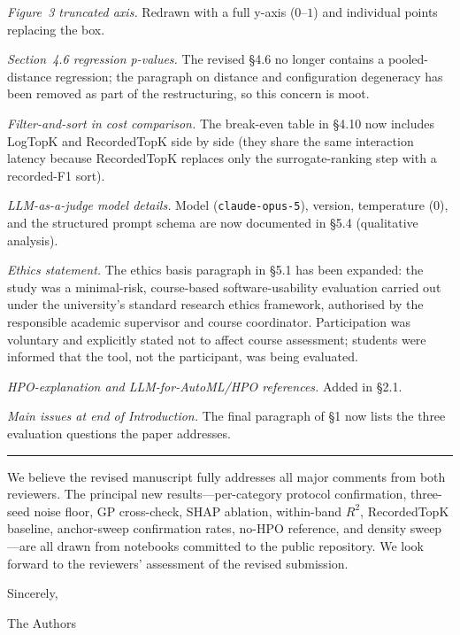 \documentclass[11pt,a4paper]{article}
\begin{document}
\noindent\textit{Figure~3 truncated axis.} Redrawn with a full
y-axis ($0$--$1$) and individual points replacing the box.

\noindent\textit{Section~4.6 regression p-values.} The revised \S4.6
no longer contains a pooled-distance regression; the paragraph on
distance and configuration degeneracy has been removed as part of the
restructuring, so this concern is moot.

\noindent\textit{Filter-and-sort in cost comparison.} The break-even
table in \S4.10 now includes LogTopK and RecordedTopK side by side
(they share the same interaction latency because RecordedTopK replaces
only the surrogate-ranking step with a recorded-F1 sort).

\noindent\textit{LLM-as-a-judge model details.} Model
(\texttt{claude-opus-5}), version, temperature (0), and the structured
prompt schema are now documented in \S5.4 (qualitative analysis).

\noindent\textit{Ethics statement.} The ethics basis paragraph in \S5.1
has been expanded: the study was a minimal-risk, course-based
software-usability evaluation carried out under the university's
standard research ethics framework, authorised by the responsible
academic supervisor and course coordinator. Participation was voluntary
and explicitly stated not to affect course assessment; students were
informed that the tool, not the participant, was being evaluated.

\noindent\textit{HPO-explanation and LLM-for-AutoML/HPO references.}
Added in \S2.1.

\noindent\textit{Main issues at end of Introduction.} The final
paragraph of \S1 now lists the three evaluation questions the paper
addresses.

\bigskip
\hrule
\bigskip

\noindent We believe the revised manuscript fully addresses all major
comments from both reviewers. The principal new results---per-category
protocol confirmation, three-seed noise floor, GP cross-check, SHAP
ablation, within-band $R^2$, RecordedTopK baseline, anchor-sweep
confirmation rates, no-HPO reference, and density sweep---are all drawn
from notebooks committed to the public repository. We look forward to
the reviewers' assessment of the revised submission.

\bigskip
\noindent Sincerely,

\noindent The Authors
\end{document}
